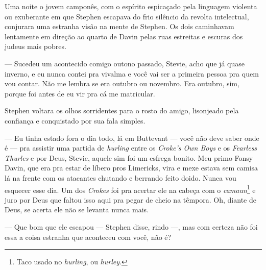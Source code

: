 Uma noite o jovem camponês, com o espírito espicaçado pela linguagem
violenta ou exuberante em que Stephen escapava do frio silêncio da
revolta intelectual, conjurara uma estranha visão na mente de Stephen.
Os dois caminhavam lentamente em direção ao quarto de Davin pelas ruas
estreitas e escuras dos judeus mais pobres.

 --- Sucedeu um acontecido	
comigo outono passado, Stevie, acho que já quase inverno, e eu nunca
contei pra vivalma e você vai ser a primeira pessoa pra quem vou
contar. Não me lembra se era outubro ou novembro. Era outubro, sim,
porque foi antes de eu vir pra cá me matricular.

Stephen voltara os olhos sorridentes para o rosto do amigo, lisonjeado
pela confiança e conquistado por sua fala simples.

 --- Eu tinha estado fora o dia todo, lá em Buttevant --- você não deve saber
onde é --- pra assistir uma partida de \textit{hurling} entre os
\textit{Croke’s Own Boys} e os \textit{Fearless
Thurles} e por Deus, Stevie, aquele sim foi um esfrega bonito. Meu
primo Fonsy Davin, que era pra estar de líbero pros Limericks,
vira e mexe estava sem camisa lá na frente com os atacantes chutando e
berrando feito doido. Nunca vou esquecer esse dia. Um dos
\textit{Crokes} foi pra acertar ele na cabeça com o
\textit{camaun}\footnote{ Taco usado no \textit{hurling}, ou \textit{hurley}.} 
e juro por Deus que faltou isso aqui pra pegar de cheio na
têmpora. Oh, diante de Deus, se acerta ele não se levanta nunca mais.

 --- Que bom que ele escapou --- Stephen disse, rindo ---, mas com certeza não foi
essa a coisa estranha que aconteceu com você, não é?


